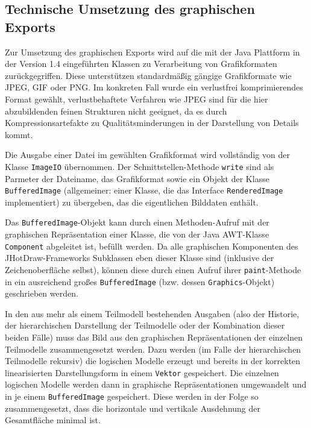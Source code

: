 
\subsection{Technische Umsetzung des graphischen Exports} %
\label{sub:technische_umsetzung_des_graphischen_exports}

Zur Umsetzung des graphischen Exports wird auf die mit der Java Plattform in der Version 1.4 eingeführten Klassen zu Verarbeitung von Grafikformaten zurückgegriffen. Diese unterstützen standardmäßig gängige Grafikformate wie \gls{JPEG}, \gls{GIF} oder \gls{PNG}. Im konkreten Fall wurde ein verlustfrei komprimierendes Format gewählt, verlustbehaftete Verfahren wie \gls{JPEG} sind für die hier abzubildenden feinen Strukturen nicht geeignet, da es durch Kompressionsartefakte zu Qualitätsminderungen in der Darstellung von Details kommt.

Die Ausgabe einer Datei im gewählten Grafikformat wird vollständig von der Klasse \texttt{ImageIO} übernommen. Der Schnittstellen-Methode \texttt{write} sind als Parmeter der Dateiname, das Grafikformat sowie ein Objekt der Klasse \texttt{BufferedImage} (allgemeiner: einer Klasse, die das Interface \texttt{RenderedImage} implementiert) zu übergeben, das die eigentlichen Bilddaten enthält.

Das \texttt{BufferedImage}-Objekt kann durch einen Methoden-Aufruf mit der graphischen Repräsentation einer Klasse, die von der Java \gls{AWT}-Klasse \texttt{Component} abgeleitet ist, befüllt werden. Da alle graphischen Komponenten des JHotDraw-Frameworks Subklassen eben dieser Klasse sind (inklusive der Zeichenoberfläche selbst), können diese durch einen Aufruf ihrer \texttt{paint}-Methode in ein ausreichend großes \texttt{BufferedImage} (bzw. dessen \texttt{Graphics}-Objekt) geschrieben werden.  

In den aus mehr als einem Teilmodell bestehenden Ausgaben (also der Historie, der hierarchischen Darstellung der Teilmodelle oder der Kombination dieser beiden Fälle) muss das Bild aus den graphischen Repräsentationen der einzelnen Teilmodelle zusammengesetzt werden. Dazu werden (im Falle der hierarchischen Teilmodelle rekursiv) die logischen Modelle erzeugt und bereits in der korrekten linearisierten Darstellungsform in einem \texttt{Vektor} gespeichert. Die einzelnen logischen Modelle werden dann in graphische Repräsentationen umgewandelt und in je einem \texttt{BufferedImage} gespeichert. Diese werden in der Folge so zusammengesetzt, dass die horizontale und vertikale Ausdehnung der Gesamtfläche minimal ist.

